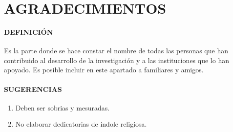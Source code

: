 \section*{AGRADECIMIENTOS}

\paragraph{DEFINICIÓN}
Es la parte donde se hace constar el nombre de todas las personas que han contribuido al desarrollo de la investigación  y a las instituciones que lo han apoyado. Es posible incluir en este apartado a familiares y amigos.

\paragraph{SUGERENCIAS}
\begin{enumerate}
 \item Deben ser sobrias y mesuradas.
 \item No elaborar dedicatorias de índole religiosa.
\end{enumerate}